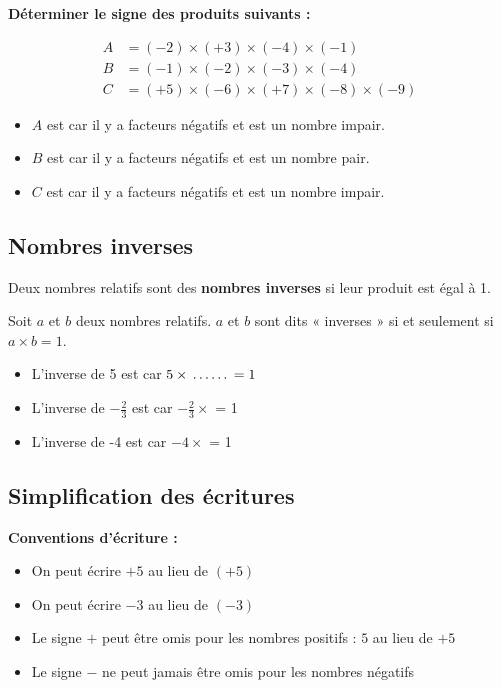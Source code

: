 \begin{examplebox}
\textbf{Déterminer le signe des produits suivants :}

\begin{align*}
A &= (-2) \times (+3) \times (-4) \times (-1) \\
B &= (-1) \times (-2) \times (-3) \times (-4) \\
C &= (+5) \times (-6) \times (+7) \times (-8) \times (-9)
\end{align*}

\begin{itemize}[label = \textbullet]
\item $A$ est \trous{2.5cm} car il y a \trous{1.5cm} facteurs négatifs et \trous{1.5cm} est un nombre impair.
\item $B$ est \trous{2.5cm} car il y a \trous{1.5cm} facteurs négatifs et \trous{1.5cm} est un nombre pair.
\item $C$ est \trous{2.5cm} car il y a \trous{1.5cm} facteurs négatifs et \trous{1.5cm} est un nombre impair.
\end{itemize}
\end{examplebox}

\subsection{Nombres inverses}
\begin{definitionbox}
Deux nombres relatifs sont des \textbf{nombres inverses} si leur produit est égal à 1.

Soit $a$ et $b$ deux nombres relatifs. $a$ et $b$ sont dits « inverses » si et seulement si $a \times b = 1$.
\end{definitionbox}

\begin{examplebox}
\begin{itemize}[label = \textbullet]
\item L'inverse de 5 est \trous{1cm} car $5 \times \trous{1cm} = 1$
\item L'inverse de $-\frac{2}{3}$ est \trous{1cm} car $-\frac{2}{3} \times$ \trous{1cm} = 1
\item L'inverse de -4 est \trous{1cm} car $-4 \times$ \trous{1cm} = 1
\end{itemize}
\end{examplebox}

\subsection{Simplification des écritures}
\begin{remarkbox}
\textbf{Conventions d'écriture :}
\begin{itemize}[label = \textbullet]
\item On peut écrire $+5$ au lieu de $(+5)$
\item On peut écrire $-3$ au lieu de $(-3)$
\item Le signe $+$ peut être omis pour les nombres positifs : $5$ au lieu de $+5$
\item Le signe $-$ ne peut jamais être omis pour les nombres négatifs
\end{itemize}
\end{remarkbox}

